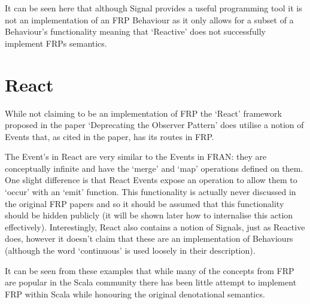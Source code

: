       It can be seen here that although Signal provides a useful programming tool it is not an implementation
      of an FRP Behaviour as it only allows for a subset of a Behaviour's functionality meaning that `Reactive'
      does not successfully implement FRPs semantics.
    
    \section{React}
      While not claiming to be an implementation of FRP the `React' framework proposed in the 
      paper `Deprecating the Observer Pattern' \cite{Maier2010} does utilise a notion of Events that, as cited in the paper,
      has its routes in FRP.
      
      The Event's in React are very similar to the Events in FRAN: they are conceptually infinite
      and have the `merge' and `map' operations defined on them. One slight difference is that React
      Events expose an operation to allow them to `occur' with an `emit' function. This functionality
      is actually never discussed in the original FRP papers and so it should be assumed that this
      functionality should be hidden publicly (it will be shown later how to internalise this action
      effectively). Interestingly, React also contains a notion of Signals, just as Reactive does, however
      it doesn't claim that these are an implementation of Behaviours (although the word `continuous' is
      used loosely in their description). 
      
  It can be seen from these examples that while many of the concepts from FRP are popular
  in the Scala community there has been little attempt to implement FRP within Scala while honouring
  the original denotational semantics.